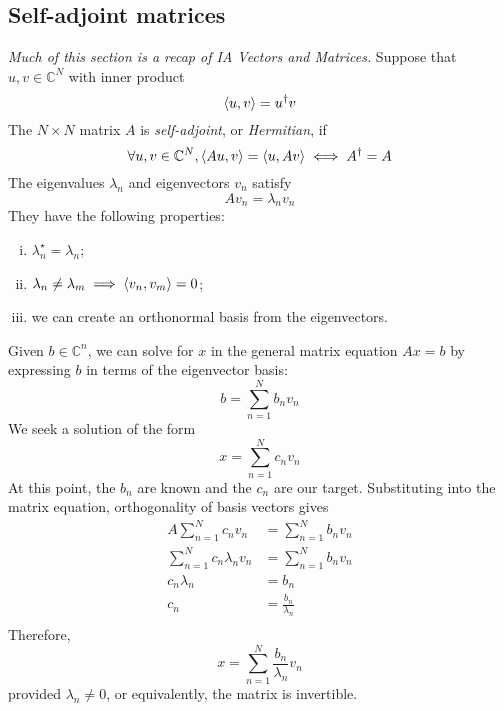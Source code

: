 \subsection{Self-adjoint matrices}
\textit{Much of this section is a recap of IA Vectors and Matrices.}
Suppose that \( u, v \in \mathbb C^N \) with inner product
\[
	\left\langle{u,v}\right\rangle = u^\dagger v
\]
The \( N \times N \) matrix \( A \) is \textit{self-adjoint}, or \textit{Hermitian}, if
\[
	\forall u,v \in \mathbb C^N, \left\langle{Au, v}\right\rangle = \left\langle{u, Av}\right\rangle \iff A^\dagger = A
\]
The eigenvalues \( \lambda_n \) and eigenvectors \( v_n \) satisfy
\[
	A v_n = \lambda_n v_n
\]
They have the following properties:
\begin{enumerate}[(i)]
	\item \( \lambda_n^\star = \lambda_n \);
	\item \( \lambda_n \neq \lambda_m \implies \left\langle{ v_n, v_m }\right\rangle = 0 \);
	\item we can create an orthonormal basis from the eigenvectors.
\end{enumerate}
Given \( b \in \mathbb C^n \), we can solve for \( x \) in the general matrix equation \( Ax = b \) by expressing \( b \) in terms of the eigenvector basis:
\[
	b = \sum_{n=1}^N b_n v_n
\]
We seek a solution of the form
\[
	x = \sum_{n=1}^N c_n v_n
\]
At this point, the \( b_n \) are known and the \( c_n \) are our target.
Substituting into the matrix equation, orthogonality of basis vectors gives
\begin{align*}
	A \sum_{n=1}^N c_n v_n         & = \sum_{n=1}^N b_n v_n  \\
	\sum_{n=1}^N c_n \lambda_n v_n & = \sum_{n=1}^N b_n v_n  \\
	c_n \lambda_n                  & = b_n                   \\
	c_n                            & = \frac{b_n}{\lambda_n} \\
\end{align*}
Therefore,
\[
	x = \sum_{n=1}^N \frac{b_n}{\lambda_n} v_n
\]
provided \( \lambda_n \neq 0 \), or equivalently, the matrix is invertible.


